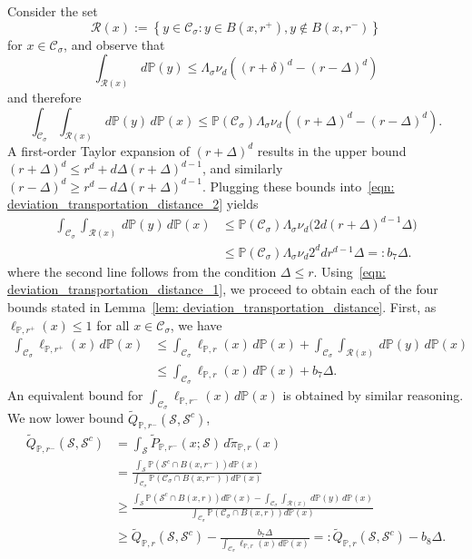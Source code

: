 \documentclass[11pt,twoside]{article}
\newcommand{\set}[1]{\left\{#1\right\}}
\newcommand{\1}{\mathbbm{1}}
\newcommand{\Pbb}{\mathbb{P}}
\newcommand{\Sset}{\mathcal{S}}
\newcommand{\Cset}{\mathcal{C}}
\newcommand{\Csig}{\Cset_{\sigma}}
\begin{document}
Consider the set
\begin{equation*}
\mathcal{R}(x) := \set{y \in \Csig: y \in B(x,r^+), y \not\in B(x,r^-)}
\end{equation*} 
for $x \in \Csig$, and observe that
\begin{equation*}
\int_{\mathcal{R}(x)} \,d\Pbb(y) \leq \Lambda_{\sigma} \nu_d \left((r + \delta)^d - (r - \varDelta)^d\right)
\end{equation*}
and therefore
\begin{equation}
\label{eqn: deviation_transportation_distance_2}
\int_{\Csig} \int_{\mathcal{R}(x)} \,d\Pbb(y) \,d\Pbb(x) \leq \Pbb(\Csig )\Lambda_{\sigma} \nu_d \left((r + \varDelta)^d - (r - \varDelta)^d\right).
\end{equation}
A first-order Taylor expansion of $(r + \varDelta)^d$ results in the upper bound $(r + \varDelta)^d \leq r^d + d\varDelta(r + \varDelta)^{d - 1}$, and similarly $(r - \varDelta)^d \geq r^d - d\varDelta(r + \varDelta)^{d - 1}$. Plugging these bounds into~\eqref{eqn: deviation_transportation_distance_2} yields
\begin{align}
\int_{\Csig} \int_{\mathcal{R}(x)} \,d\Pbb(y) \,d\Pbb(x)  & \leq \Pbb(\Csig) \Lambda_{\sigma} \nu_d \bigl( 2d(r + \Delta)^{d - 1}\varDelta \bigr) \tag{1st-order Taylor expansion of $(r + \Delta)^d$ } \\
& \leq \Pbb(\Csig) \Lambda_{\sigma} \nu_d  2^{d}d r^{d-1}\varDelta =: b_7 \varDelta. \label{eqn: deviation_transportation_distance_1}
\end{align}
where the second line follows from the condition $\Delta \leq r$. Using~\eqref{eqn: deviation_transportation_distance_1}, we proceed to obtain each of the four bounds stated in Lemma~\ref{lem: deviation_transportation_distance}. First, as $\ell_{\Pbb,r^{+}}(x) \leq 1$ for all $x \in \Csig$, we have
\begin{align*}
\int_{\Csig} \ell_{\Pbb,r^+}(x) \,d\Pbb(x) & \leq \int_{\Csig} \ell_{\Pbb,r}(x) \,d\Pbb(x) + \int_{\Csig} \int_{\mathcal{R}(x)} \,d\Pbb(y) \,d\Pbb(x) \\
& \leq \int_{\Csig} \ell_{\Pbb,r}(x) \,d\Pbb(x) + b_7\varDelta.
\end{align*}
An equivalent bound for $\int_{\Csig} \ell_{\Pbb,r^-}(x) \,d\Pbb(x)$ is obtained by similar reasoning. We now lower bound $\widetilde{Q}_{\Pbb,r^{-}}(\Sset, \Sset^c)$,
\begin{align*}
\widetilde{Q}_{\Pbb,r^{-}}(\Sset, \Sset^c) & = \int_{\Sset} \widetilde{P}_{\Pbb,r^-}(x; \Sset) \,d\widetilde{\pi}_{\Pbb,r}(x) \\
& = \frac{\int_{\Sset} \Pbb(\Sset^c \cap B(x,r^-)) d\Pbb(x)}{\int_{\Csig} \Pbb(\Csig \cap B(x,r^-)) d\Pbb(x)} \\
& \geq \frac{\int_{\Sset} \Pbb(\Sset^c \cap B(x,r)) d\Pbb(x) - \int_{\Csig} \int_{\mathcal{R}(x)} \,d\Pbb(y) \,d\Pbb(x)}{\int_{\Csig} \Pbb(\Csig \cap B(x,r)) d\Pbb(x)} \\
& \geq \widetilde{Q}_{\Pbb,r}(\Sset, \Sset^c) - \frac{b_7 \varDelta}{\int_{\Csig}\ell_{\Pbb,r}(x) \,d\Pbb(x)} =:\widetilde{Q}_{\Pbb,r}(\Sset, \Sset^c) - b_8 \varDelta.
\end{align*}
\end{document}
